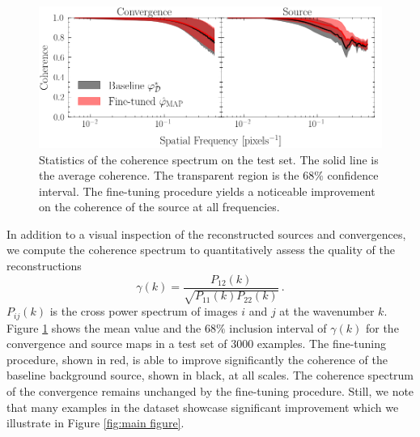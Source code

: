 \begin{figure}[th!]
        \centering
        \includegraphics[width=0.7\linewidth]{figures/coherence_spectrum}
        \caption{Statistics of the coherence spectrum on the test set. The solid line is the average 
        coherence. The transparent region is the $68\%$ confidence interval. The fine-tuning 
        procedure yields a noticeable improvement on the coherence of the source at all frequencies.}
        \label{fig:coherence}
\end{figure}


In addition to a visual inspection of the reconstructed sources 
and convergences, we compute 
the coherence spectrum to quantitatively assess the quality of the reconstructions
\begin{equation}\label{eq:coherence} 
        \gamma(k) = \frac{P_{12}(k)}{\sqrt{P_{11}(k) P_{22}(k)}} \, .
\end{equation}
$P_{ij}(k)$ is the cross power spectrum of images $i$ and $j$ at 
the wavenumber $k$. Figure \ref{fig:coherence} shows the mean value and the $68\%$ inclusion interval of $\gamma(k)$ 
for the convergence and source maps in a test set of 3000 examples. 
The fine-tuning 
procedure, shown in red, is able to improve significantly the coherence of the baseline background 
source, shown in black, at all scales. 
The coherence spectrum of the convergence remains unchanged by the fine-tuning procedure.
Still, we note that many examples in the dataset showcase significant 
improvement which we illustrate in Figure \ref{fig:main figure}.




